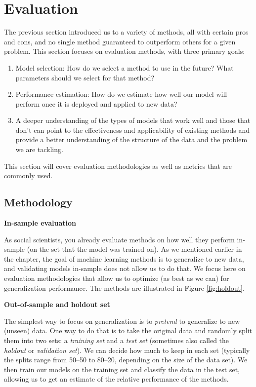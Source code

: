 \documentclass[]{krantz}
\begin{document}
\section{Evaluation}\label{sec:7-7}

The previous section introduced us to a variety of methods, all with
certain pros and cons, and no single method guaranteed to outperform
others for a given problem. This section focuses on evaluation methods,
with three primary goals:

\begin{enumerate}
\def\labelenumi{\arabic{enumi}.}
\item
  Model selection: How do we select a method to use in the future? What
  parameters should we select for that method?
\item
  Performance estimation: How do we estimate how well our model will
  perform once it is deployed and applied to new data?
\item
  A deeper understanding of the types of models that work well and those
  that don't can point to the effectiveness and applicability of
  existing methods and provide a better understanding of the structure
  of the data and the problem we are tackling.
\end{enumerate}

This section will cover evaluation methodologies as well as metrics that
are commonly used.

\subsection{Methodology}\label{sec:7-7.1}

\textbf{In-sample evaluation}

As social scientists, you already evaluate methods on how well they
perform in-sample (on the set that the model was trained on). As we
mentioned earlier in the chapter, the goal of machine learning methods
is to generalize to new data, and validating models in-sample does not
allow us to do that. We focus here on evaluation methodologies that
allow us to optimize (as best as we can) for generalization performance.
The methods are illustrated in Figure \ref{fig:holdout}.

\textbf{Out-of-sample and holdout set}

The simplest way to focus on generalization is to \emph{pretend} to
generalize to new (unseen) data. One way to do that is to take the
original data and randomly split them into two sets: a \emph{training
set} and a \emph{test set} (sometimes also called the \emph{holdout} or
\emph{validation set}). We can decide how much to keep in each set
(typically the splits range from 50--50 to 80--20, depending on the size
of the data set). We then train our models on the training set and
classify the data in the test set, allowing us to get an estimate of the
relative performance of the methods.
\end{document}
